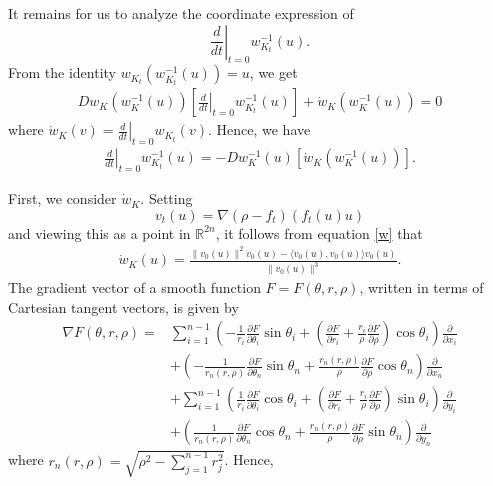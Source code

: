 \documentclass[12pt]{amsart}
\theoremstyle{definition}
\newcommand{\RR}{{\mathbb R}}
\begin{document}
It remains for us to analyze the coordinate expression of $$\left.\frac{d}{dt}\right|_{t=0} w^{-1}_{K_t}(u).$$
From the identity $w_{K_t}(w_{K_t}^{-1}(u))=u$, we get 
\begin{align*}
     D w_{K}(w_{K}^{-1}(u)) \left[\left.\frac{d}{dt}\right|_{t=0} w_{K_t}^{-1} (u) \right] + \dot{w}_{K} (w_{K}^{-1}(u)) =0
\end{align*}
where $\dot{w}_{K} (v) =\left.\frac{d}{dt}\right|_{t=0} w_{K_t} (v)$.
Hence, we have  
\begin{align}\label{dinverse}
 \left.\frac{d}{dt}\right|_{t=0} w_{K_t}^{-1} (u) = -D w_{K}^{-1} (u) \left[ \dot{w}_{K} (w_{K}^{-1}(u)) \right].
\end{align}




First, we consider $\dot{w}_{K}.$ 
Setting  $$v_t(u) = \nabla(\rho-f_t)(f_t(u)u)$$ and viewing this as a point in $\RR^{2n}$, it follows from equation \eqref{w} that
\begin{align}\label{w2v}
    \dot{w}_{K}(u) = \frac{\|v_0(u)\|^{2} \dot{v}_0(u) - \langle \dot{v}_0(u),v_0(u) \rangle v_0(u)}{\|v_0(u)\|^{3}}.
\end{align}
The gradient vector of a smooth function $F=F(\theta,r,\rho)$, written in terms of Cartesian tangent vectors, is given by 
\begin{align*}
    \nabla F(\theta, r, \rho) =& \sum_{i=1}^{n-1}\left(-\frac{1}{r_i}\frac{\partial F}{\partial \theta_i}\sin \theta_i + \left(\frac{\partial F}{\partial r_i} + \frac{r_i}{\rho}
    \frac{\partial F}{\partial \rho}\right)\cos \theta_i \right)\frac{\partial}{\partial x_i} \\ \nonumber&+ \left(-\frac{1}{r_n(r,\rho)}\frac{\partial F}{\partial \theta_n}\sin \theta_n  +  \frac{r_n(r,\rho)}{\rho} \frac{\partial F}{\partial \rho}\cos \theta_n \right)\frac{\partial}{\partial x_n}  \\ \nonumber&+ \sum_{i=1}^{n-1}\left(\frac{1}{r_i}\frac{\partial F}{\partial \theta_i}\cos \theta_i + \left(\frac{\partial F}{\partial r_i} + \frac{r_i}{\rho}
    \frac{\partial F}{\partial \rho}\right)\sin \theta_i \right)\frac{\partial}{\partial y_i} \\ \nonumber&+ \left(\frac{1}{r_n(r,\rho)}\frac{\partial F}{\partial \theta_n}\cos \theta_n  + \frac{r_n(r,\rho)}{\rho}  \frac{\partial F}{\partial \rho}\sin \theta_n \right)\frac{\partial}{\partial y_n}
\end{align*}
where $r_n(r,\rho) = \sqrt{\rho^2 - \sum_{j=1}^{n-1}r_j^2}$. 
Hence,
\end{document}
